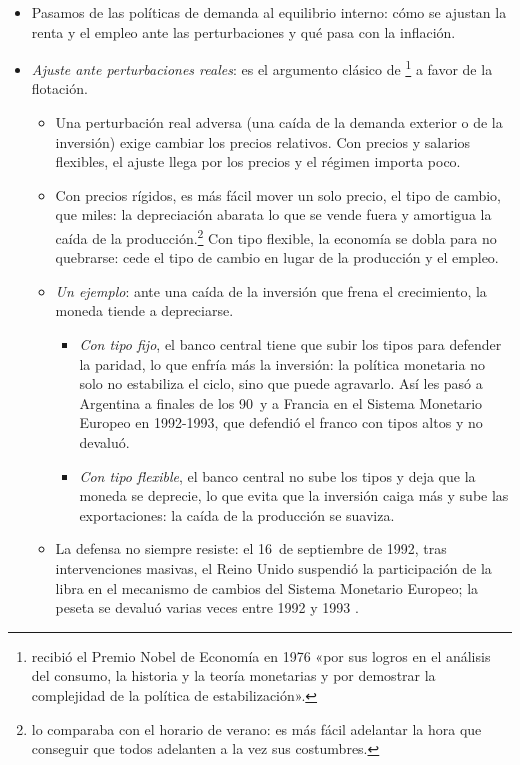 \documentclass[11pt]{article}
\begin{document}
\begin{itemize}
\item Pasamos de las políticas de demanda al equilibrio interno: cómo se ajustan la renta y el empleo ante las perturbaciones y qué pasa con la inflación.
\item \emph{Ajuste ante perturbaciones reales}: es el argumento clásico de \textcite{Friedman1953Case}\footnote{ recibió el Premio Nobel de Economía en 1976 «por sus logros en el análisis del consumo, la historia y la teoría monetarias y por demostrar la complejidad de la política de estabilización»\nocite{Nobel1976Friedman}.} a favor de la flotación.
  \begin{itemize}
  \item Una perturbación real adversa (una caída de la demanda exterior o de la inversión) exige cambiar los precios relativos. Con precios y salarios flexibles, el ajuste llega por los precios y el régimen importa poco.
  \item Con precios rígidos, es más fácil mover un solo precio, el tipo de cambio, que miles: la depreciación abarata lo que se vende fuera y amortigua la caída de la producción.\footnote{\textcite{Friedman1953Case} lo comparaba con el horario de verano: es más fácil adelantar la hora que conseguir que todos adelanten a la vez sus costumbres.} Con tipo flexible, la economía se dobla para no quebrarse: cede el tipo de cambio en lugar de la producción y el empleo.
  \item \emph{Un ejemplo}: ante una caída de la inversión que frena el crecimiento, la moneda tiende a depreciarse.
    \begin{itemize}
    \item \emph{Con tipo fijo}, el banco central tiene que subir los tipos para defender la paridad, lo que enfría más la inversión: la política monetaria no solo no estabiliza el ciclo, sino que puede agravarlo. Así les pasó a Argentina a finales de los 90~y a Francia en el Sistema Monetario Europeo en 1992-1993, que defendió el franco con tipos altos y no devaluó.
    \item \emph{Con tipo flexible}, el banco central no sube los tipos y deja que la moneda se deprecie, lo que evita que la inversión caiga más y sube las exportaciones: la caída de la producción se suaviza.
    \end{itemize}
  \item La defensa no siempre resiste: el 16~de septiembre de 1992, tras intervenciones masivas, el Reino Unido suspendió la participación de la libra en el mecanismo de cambios del Sistema Monetario Europeo\nocite{BoE1992Operation}; la peseta se devaluó varias veces entre 1992 y 1993\nocite{EichengreenWyplosz1993Unstable}   .

\end{itemize}
\end{itemize}
\end{document}
